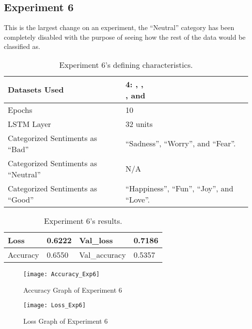 \subsection{Experiment 6}
This is the largest change on an experiment, the ``Neutral'' category has been completely disabled with the purpose of seeing how the rest of the data would be classified as.
\begin{table}[!h]
	\caption{Experiment 6's defining characteristics.}
	\vspace{0.5cm}
	\centering
	\begin{tabular}[t]{|l|l|}
	\hline
		Datasets Used & \makecell{4: \citet{d1}, \citet{d2},\\ \citet{d3}, and \citet{d4}}
	\\ \hline
		Epochs & 10
	\\ \hline
		LSTM Layer & 32 units
	\\ \hline
		Categorized Sentiments as ``Bad'' & ``Sadness'', ``Worry'', and ``Fear''.
	\\ \hline	
		 Categorized Sentiments as ``Neutral'' & N/A
	\\ \hline	
		Categorized Sentiments as ``Good'' & ``Happiness'', ``Fun'', ``Joy'', and ``Love''.
	\\ \hline
	\end{tabular}
\end{table}

\begin{table}[!b]
	\caption{Experiment 6's results.}
	\vspace{0.5cm}
	\centering
	\begin{tabular}[t]{|l|l|l|l|}
	\hline
		Loss & 0.6222 & Val\_loss & 0.7186
	\\ \hline
		Accuracy & 0.6550 & Val\_accuracy & 0.5357
	\\ \hline
	\end{tabular}
\end{table}


\begin{figure}[!h]
	\centering
	\texttt{[image: Accuracy\_Exp6]}
	\caption{Accuracy Graph of Experiment 6}
	\label{fig:accuracy_exp6}
	\texttt{[image: Loss\_Exp6]}
	\caption{Loss Graph of Experiment 6}
	\label{fig:loss_exp6}
\end{figure}
\pagebreak

